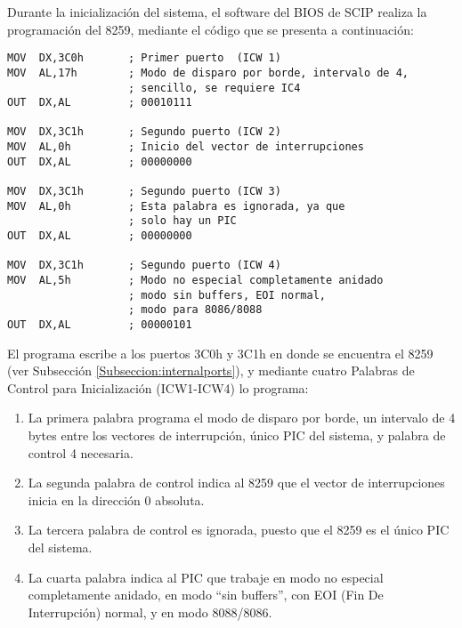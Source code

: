 Durante la inicializaci\'on del sistema, el software del BIOS de SCIP realiza la programaci\'on %
del 8259, mediante el c\'odigo que se presenta a continuaci\'on:

\vspace{12pt}

\begin{verbatim}
MOV  DX,3C0h       ; Primer puerto  (ICW 1)
MOV  AL,17h        ; Modo de disparo por borde, intervalo de 4, 
                   ; sencillo, se requiere IC4 
OUT  DX,AL         ; 00010111

MOV  DX,3C1h       ; Segundo puerto (ICW 2)
MOV  AL,0h         ; Inicio del vector de interrupciones
OUT  DX,AL         ; 00000000

MOV  DX,3C1h       ; Segundo puerto (ICW 3)
MOV  AL,0h         ; Esta palabra es ignorada, ya que 
                   ; solo hay un PIC
OUT  DX,AL         ; 00000000

MOV  DX,3C1h       ; Segundo puerto (ICW 4)
MOV  AL,5h         ; Modo no especial completamente anidado
                   ; modo sin buffers, EOI normal, 
                   ; modo para 8086/8088 
OUT  DX,AL         ; 00000101
\end{verbatim}

\vspace{12pt}

El programa escribe a los puertos 3C0h y 3C1h en donde se encuentra el 8259 (ver Subsecci\'on %
\ref{Subseccion:internalports}), y mediante cuatro Palabras de Control para Inicializaci\'on %
(ICW1-ICW4) lo programa:

\begin{enumerate}
\item La primera palabra programa el modo de disparo por borde, un intervalo de 4 bytes entre %
los vectores de interrupci\'on, \'unico PIC del sistema, y palabra de control 4 necesaria.
\item La segunda palabra de control indica al 8259 que el vector de interrupciones inicia en la %
direcci\'on 0 absoluta.
\item La tercera palabra de control es ignorada, puesto que el 8259 es el \'unico PIC del %
sistema.
\item La cuarta palabra indica al PIC que trabaje en modo no especial completamente anidado, en %
modo ``sin buffers'', con EOI (Fin De In\-te\-rrup\-ci\-\'on) normal, y en modo 8088/8086.
\end{enumerate}


